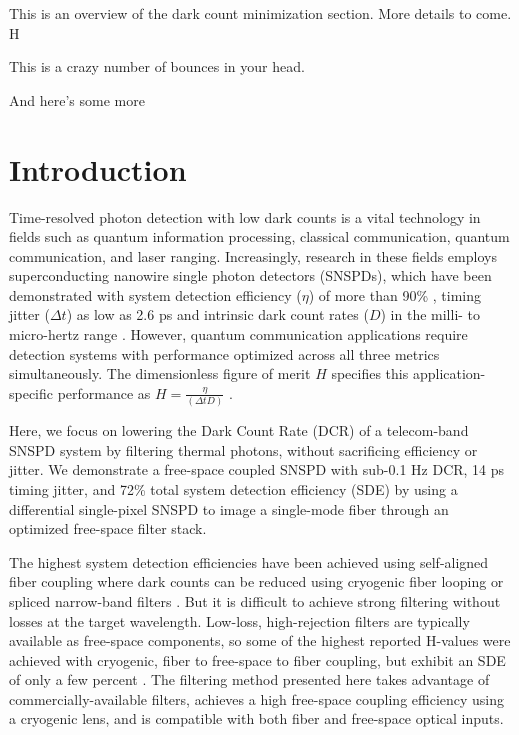 \documentclass[12pt]{caltech_thesis}
\begin{document}
This is an overview of the dark count minimization section. More details
to come. H

This is a crazy number of bounces in your head.

And here's some more

\hypertarget{introduction}{%
\section{Introduction}\label{introduction}}

Time-resolved photon detection with low dark counts is a vital
technology in fields such as quantum information processing, classical
communication, quantum communication, and laser ranging. Increasingly,
research in these fields employs superconducting nanowire single photon
detectors (SNSPDs), which have been demonstrated with system detection
efficiency (\(\eta\)) of more than 90\% \autocite{Reddy2020}, timing
jitter (\(\Delta t\)) as low as 2.6 ps \autocite{Korzh2020} and
intrinsic dark count rates (\(D\)) in the milli- to micro-hertz range
\autocite{Hochberg2019}. However, quantum communication applications
require detection systems with performance optimized across all three
metrics simultaneously. The dimensionless figure of merit \(H\)
specifies this application-specific performance as
\(H = \frac{\eta}{(\Delta t D)}\) \autocite{Hadfield2009}.

Here, we focus on lowering the Dark Count Rate (DCR) of a telecom-band
SNSPD system by filtering thermal photons, without sacrificing
efficiency or jitter. We demonstrate a free-space coupled SNSPD with
sub-0.1 Hz DCR, 14 ps timing jitter, and 72\% total system detection
efficiency (SDE) by using a differential single-pixel SNSPD
\autocite{Colangelo2021} to image a single-mode fiber through an
optimized free-space filter stack.

The highest system detection efficiencies have been achieved using
self-aligned fiber coupling where dark counts can be reduced using
cryogenic fiber looping \autocite{Cohen2015} or spliced narrow-band
filters \autocite{Boaron2018secure}. But it is difficult to achieve
strong filtering without losses at the target wavelength. Low-loss,
high-rejection filters are typically available as free-space components,
so some of the highest reported H-values were achieved with cryogenic,
fiber to free-space to fiber coupling, but exhibit an SDE of only a few
percent \autocite{Shibata2015}. The filtering method presented here
takes advantage of commercially-available filters, achieves a high
free-space coupling efficiency using a cryogenic lens, and is compatible
with both fiber and free-space optical inputs.
\end{document}
